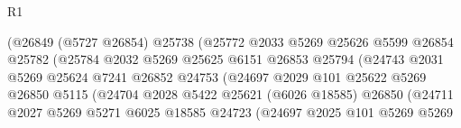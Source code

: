 \begin{lexlean}{R1}
\begin{coremodule}
                                      (@26849
                                        (@5727 @26854)
                                        @25738
                                        (@25772
                                          @2033
                                          @5269
                                          @25626
                                          @5599
                                          @26854
                                          @25782
                                          (@25784
                                            @2032
                                            @5269
                                            @25625
                                            @6151
                                            @26853
                                            @25794
                                            (@24743
                                              @2031
                                              @5269
                                              @25624
                                              @7241
                                              @26852
                                              @24753
                                              (@24697
                                                @2029
                                                @101
                                                @25622
                                                @5269
                                                @26850
                                                @5115
                                                (@24704
                                                  @2028
                                                  @5422
                                                  @25621
                                                  (@6026 @18585)
                                                  @26850
                                                  (@24711
                                                    @2027
                                                    @5269
                                                    @5271
                                                    @6025
                                                    @18585
                                                    @24723
                                                    (@24697
                                                      @2025
                                                      @101
                                                      @5269
                                                      @5269

\end{coremodule}
\end{lexlean}
